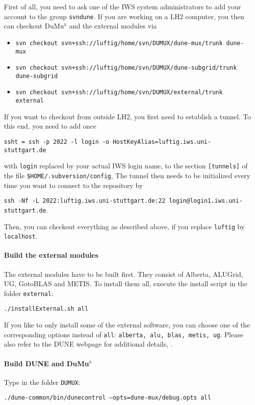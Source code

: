 First of all, you need to ask one of the IWS system administrators to 
add your account to the group \texttt{svndune}. 
If you are working on a LH2 computer, you then can checkout DuMu$^\text{x}$ 
and the external modules via 
\begin{itemize}
\item \texttt{svn checkout svn+ssh://luftig/home/svn/DUMUX/dune-mux/trunk dune-mux}
\item \texttt{svn checkout svn+ssh://luftig/home/svn/DUMUX/dune-subgrid/trunk dune-subgrid}
\item \texttt{svn checkout svn+ssh://luftig/home/svn/DUMUX/external/trunk external}
\end{itemize} 
If you want to checkout from outside LH2, you first need to establish a tunnel. 
To this end, you need to add once 
\begin{center}
\texttt{ssht = ssh -p 2022 -l login -o HostKeyAlias=luftig.iws.uni-stuttgart.de} 
\end{center}
with \texttt{login} replaced 
by your actual IWS login name, to the section \texttt{[tunnels]} of the 
file \texttt{\$HOME/.subversion/config}, 
The tunnel then needs to be initialized every time you want 
to connect to the repository by 
\begin{center}
\texttt{ssh -Nf -L 2022:luftig.iws.uni-stuttgart.de:22 login@login1.iws.uni-stuttgart.de}.
\end{center}
Then, you can checkout everything as described above, if you replace \texttt{luftig} 
by \texttt{localhost}. 


\paragraph{Build the external modules} 
The external modules have to be built first. They consist of Alberta, ALUGrid, UG, GotoBLAS and METIS.
To install them all, execute the install script in the folder \texttt{external}:
\begin{center}
\texttt{./installExternal.sh all}
\end{center}
If you like to only install some of the external software, you can choose one of the corresponding options instead of \texttt{all}: \texttt{alberta, alu, blas, metis, ug}.
Please also refer to the DUNE webpage for additional details, \cite{DUNE-HP}. 

\paragraph{Build DUNE and DuMu$^\text{x}$}
Type in the folder \texttt{DUMUX}: 
\begin{center}
\texttt{./dune-common/bin/dunecontrol --opts=dune-mux/debug.opts all}
\end{center}

